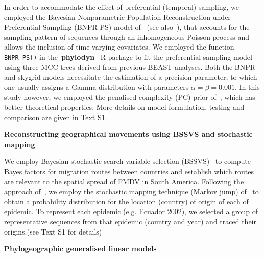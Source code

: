 \documentclass[10pt]{article}
\begin{document}
In order to accommodate the effect of preferential (temporal) sampling, we employed the Bayesian Nonparametric Population Reconstruction under Preferential Sampling (BNPR-PS) model of~\cite{Karcher2020} (see also~\cite{Karcher2016}), that accounts for the sampling pattern of sequences through an inhomogeneous Poisson process and allows the inclusion of time-varying covariates.
We employed the function \verb|BNPR_PS()| in the~\textbf{phylodyn}~\citep{Karcher2017} R package to fit the preferential-sampling model using three MCC trees derived from previous BEAST analyses. %
Both the BNPR and skygrid models necessitate the estimation of a precision parameter, to which one usually assigns a Gamma distribution with parameters $\alpha = \beta = 0.001$.
In this study however, we employed the penalised complexity (PC) prior of~\cite{Simpson2017}, which has better theoretical properties. %
More details on model formulation, testing and comparison are given in Text S1. %

\textbf{Reconstructing geographical movements using BSSVS and stochastic mapping}

We employ Bayesian stochastic search variable selection (BSSVS)~\citep{Lemey2009} to compute Bayes factors for migration routes between countries and establish which routes are relevant to the spatial spread of FMDV in South America.
Following the approach of~\citet{Hall2013}, we employ the stochastic mapping technique (Markov jump) of~\cite{Minin2008b} to obtain a probability distribution for the location (country) of origin of each of epidemic.
To represent each epidemic (e.g. Ecuador 2002), we selected a group of representative sequences from that epidemic (country and year) and traced their origins.(see Text S1 for details)

\textbf{Phylogeographic generalised linear models}
\end{document}
